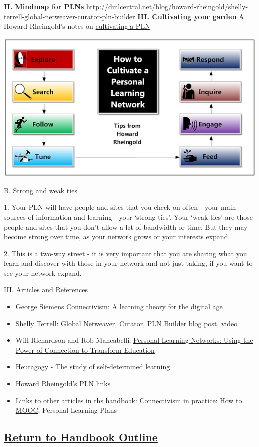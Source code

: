 \textbf{II. Mindmap for PLNs}
http://dmlcentral.net/blog/howard-rheingold/shelly-terrell-global-netweaver-curator-pln-builder
\textbf{III. Cultivating your garden} A. Howard Rheingold's notes on
\href{http://howardrheingoldsteachingnotes.posterous.com/notes-on-growing-a-personal-learning-network}{cultivating
a PLN}

\begin{center}
\includegraphics[width=.75\textwidth]{../pictures/network.jpg}
\end{center}

B. Strong and weak ties

1. Your PLN will have people and sites that you check on often - your
main sources of information and learning - your `strong ties'. Your
`weak ties' are those people and sites that you don't allow a lot of
bandwidth or time. But they may become strong over time, as your network
grows or your interests expand.

2. This is a two-way street - it is very important that you are sharing
what you learn and discover with those in your network and not just
taking, if you want to see your network expand.

III. Articles and References

\begin{itemize}
\item
  George Siemens
  \href{http://www.itdl.org/journal/jan\_05/article01.htm}{Connectivism:
  A learning theory for the digital age}
\item
  \href{http://dmlcentral.net/blog/howard-rheingold/shelly-terrell-global-netweaver-curator-pln-builder}{Shelly
  Terrell: Global Netweaver, Curator, PLN Builder} blog post, video
\item
  Will Richardson and Rob Mancabelli,
  \href{http://weblogg-ed.com/2011/personal-learning-networks-an-excerpt/}{Personal
  Learning Networks: Using the Power of Connection to Transform
  Education}
\item
  \href{http://en.wikipedia.org/wiki/Heutagogy}{Heutagogy} - The study
  of self-determined learning
\item
  \href{http://delicious.com/hrheingold/pln}{Howard Rheingold's PLN
  links}
\item
  Links to other articles in ths handbook:
  \href{http://peeragogy.org/connectivism-in-practice-how-to-organize-a-mooc/}{Connectivism
  in practice: How to MOOC,} Personal Learning Plans
\end{itemize}
\subsection{\href{http://socialmediaclassroom.com/host/peeragogy/wiki/initial-outline-source-book}{Return
to Handbook Outline}}

